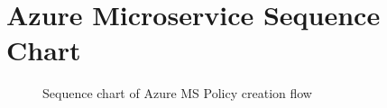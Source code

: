 \appendix

\makeatletter
\renewcommand{\@makechapterhead}[1]{\vspace *{-10\p@ }{\parindent \z@ 
\raggedright \normalfont \ifnum \c@secnumdepth >\m@ne \Huge \bfseries 
\@chapapp \space \thechapter \vskip 10\p@ \fi #1\par \nobreak \vskip 30\p@ }}
\makeatother

\chapter{Azure Microservice Sequence Chart}
\label{azure_ms_sequence_chart}
\vspace*{-0.3in}
\begin{figure}[hb!]
\begin{center}
\end{center}
\caption[Sequence chart of Azure MS Policy creation flow]{Sequence chart of Azure MS Policy creation flow}
\end{figure}